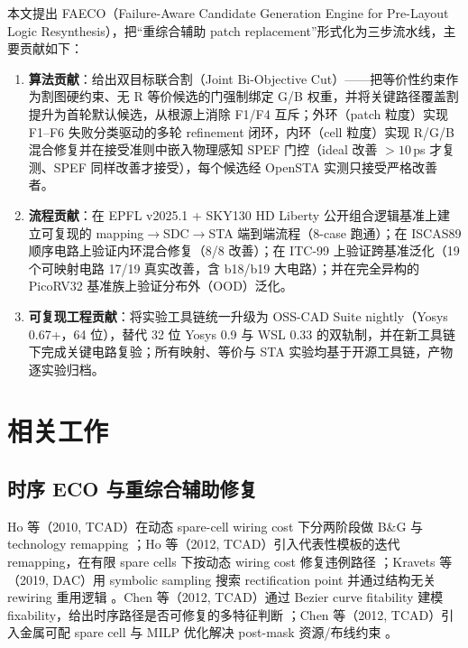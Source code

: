 \documentclass[journal]{IEEEtran}
\begin{document}
本文提出 FAECO（Failure-Aware Candidate Generation Engine for Pre-Layout Logic Resynthesis），把“重综合辅助 patch replacement”形式化为三步流水线，主要贡献如下：

\begin{enumerate}
  \item \textbf{算法贡献}：给出双目标联合割（Joint Bi-Objective Cut）——把等价性约束作为割图硬约束、无 R 等价候选的门强制绑定 G/B 权重，并将关键路径覆盖割提升为首轮默认候选，从根源上消除 F1/F4 互斥；外环（patch 粒度）实现 F1--F6 失败分类驱动的多轮 refinement 闭环，内环（cell 粒度）实现 R/G/B 混合修复并在接受准则中嵌入物理感知 SPEF 门控（ideal 改善 $>10$\,ps 才复测、SPEF 同样改善才接受），每个候选经 OpenSTA 实测只接受严格改善者。
  \item \textbf{流程贡献}：在 EPFL v2025.1 + SKY130 HD Liberty 公开组合逻辑基准上建立可复现的 mapping$\rightarrow$SDC$\rightarrow$STA 端到端流程（8-case 跑通）；在 ISCAS89 顺序电路上验证内环混合修复（8/8 改善）；在 ITC-99 上验证跨基准泛化（19 个可映射电路 17/19 真实改善，含 b18/b19 大电路）；并在完全异构的 PicoRV32 基准族上验证分布外（OOD）泛化。
  \item \textbf{可复现工程贡献}：将实验工具链统一升级为 OSS-CAD Suite nightly（Yosys 0.67+，64 位），替代 32 位 Yosys 0.9 与 WSL 0.33 的双轨制，并在新工具链下完成关键电路复验；所有映射、等价与 STA 实验均基于开源工具链，产物逐实验归档。
\end{enumerate}

\section{相关工作}

\subsection{时序 ECO 与重综合辅助修复}

Ho 等（2010, TCAD）在动态 spare-cell wiring cost 下分两阶段做 B\&G 与 technology remapping \cite{ho2010eco}；Ho 等（2012, TCAD）引入代表性模板的迭代 remapping，在有限 spare cells 下按动态 wiring cost 修复违例路径 \cite{ho2012treco}；Kravets 等（2019, DAC）用 symbolic sampling 搜索 rectification point 并通过结构无关 rewiring 重用逻辑 \cite{kravets2019symbolic}。Chen 等（2012, TCAD）通过 Bezier curve fitability 建模 fixability，给出时序路径是否可修复的多特征判断 \cite{chen2012fixability}；Chen 等（2012, TCAD）引入金属可配 spare cell 与 MILP 优化解决 post-mask 资源/布线约束 \cite{chen2012metal}。
\end{document}
